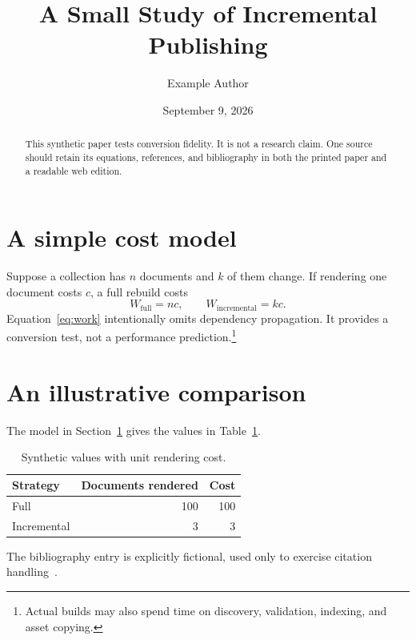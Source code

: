 \documentclass[11pt]{article}
\title{A Small Study of Incremental Publishing}
\author{Example Author}
\date{September 9, 2026}
\begin{document}
\maketitle
\begin{abstract}
This synthetic paper tests conversion fidelity. It is not a research claim.
One source should retain its equations, references, and bibliography in both
the printed paper and a readable web edition.
\end{abstract}

\section{A simple cost model}\label{sec:model}
Suppose a collection has \(n\) documents and \(k\) of them change.
If rendering one document costs \(c\), a full rebuild costs
\begin{equation}\label{eq:work}
W_{\mathrm{full}}=nc,\qquad W_{\mathrm{incremental}}=kc.
\end{equation}
Equation~\eqref{eq:work} intentionally omits dependency propagation.
It provides a conversion test, not a performance prediction.\footnote{Actual
builds may also spend time on discovery, validation, indexing, and asset copying.}

\section{An illustrative comparison}\label{sec:comparison}
The model in Section~\ref{sec:model} gives the values in Table~\ref{tab:cost}.
\begin{table}[h]
\centering
\begin{tabular}{lrr}
Strategy & Documents rendered & Cost \\
\hline
Full & 100 & 100 \\
Incremental & 3 & 3 \\
\end{tabular}
\caption{Synthetic values with unit rendering cost.}\label{tab:cost}
\end{table}

The bibliography entry is explicitly fictional, used only to exercise
citation handling~\cite{example}.



\end{document}
